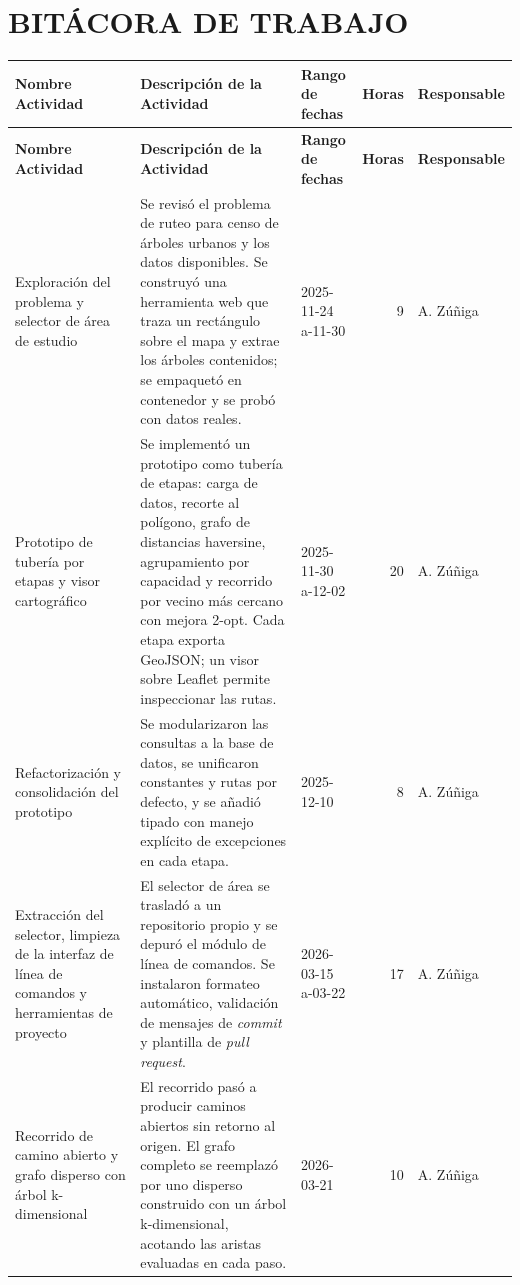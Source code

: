 \chapter*{\centering BITÁCORA DE TRABAJO}

\footnotesize
\setlength{\tabcolsep}{3pt}
\begin{xltabular}{\linewidth}{|p{3cm}|X|p{3cm}|r|l|}
\hline
\textbf{Nombre Actividad} & \textbf{Descripción de la Actividad} & \textbf{Rango de fechas} & \textbf{Horas} & \textbf{Responsable} \\
\hline
\endfirsthead
\hline
\textbf{Nombre Actividad} & \textbf{Descripción de la Actividad} & \textbf{Rango de fechas} & \textbf{Horas} & \textbf{Responsable} \\
\hline
\endhead
\hline
\endfoot
Exploración del problema y selector de área de estudio & Se revisó el problema de ruteo para censo de árboles urbanos y los datos disponibles. Se construyó una herramienta web que traza un rectángulo sobre el mapa y extrae los árboles contenidos; se empaquetó en contenedor y se probó con datos reales. & 2025-11-24 a-11-30 & 9 & A. Zúñiga \\
\hline
Prototipo de tubería por etapas y visor cartográfico & Se implementó un prototipo como tubería de etapas: carga de datos, recorte al polígono, grafo de distancias haversine, agrupamiento por capacidad y recorrido por vecino más cercano con mejora 2-opt. Cada etapa exporta GeoJSON; un visor sobre Leaflet permite inspeccionar las rutas. & 2025-11-30 a-12-02 & 20 & A. Zúñiga \\
\hline
Refactorización y consolidación del prototipo & Se modularizaron las consultas a la base de datos, se unificaron constantes y rutas por defecto, y se añadió tipado con manejo explícito de excepciones en cada etapa. & 2025-12-10 & 8 & A. Zúñiga \\
\hline
Extracción del selector, limpieza de la interfaz de línea de comandos y herramientas de proyecto & El selector de área se trasladó a un repositorio propio y se depuró el módulo de línea de comandos. Se instalaron formateo automático, validación de mensajes de \textit{commit} y plantilla de \textit{pull request}. & 2026-03-15 a-03-22 & 17 & A. Zúñiga \\
\hline
Recorrido de camino abierto y grafo disperso con árbol k-dimensional & El recorrido pasó a producir caminos abiertos sin retorno al origen. El grafo completo se reemplazó por uno disperso construido con un árbol k-dimensional, acotando las aristas evaluadas en cada paso. & 2026-03-21 & 10 & A. Zúñiga \\

\end{xltabular}
